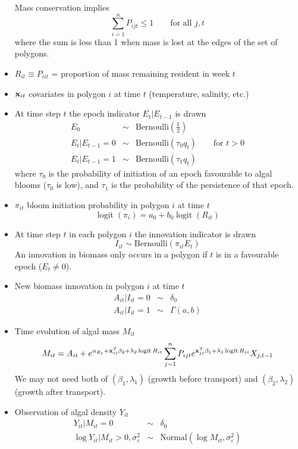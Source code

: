 \documentclass[
]{article}
\DeclareMathOperator*{\logit}{logit}
\begin{document}
\begin{itemize}
  Mass conservation implies \[ 
    \sum_{i=1}^n P_{ijt}\leq 1 \qquad\text{for all $j,t$}
  \] where the sum is less than 1 when mass is lost at the edges of the
  set of polygons.
\item
  \(R_{it} \equiv P_{iit}\) = proportion of mass remaining resident in
  week \(t\)
\item
  \({\bf x}_{it}\) covariates in polygon \(i\) at time \(t\)
  (temperature, salinity, etc.)
\item
  At time step \(t\) the epoch indicator \(E_t|E_{t-1}\) is drawn
  \begin{eqnarray*}
     E_0           &\sim& \text{Bernoulli}(\mbox{$\frac12$})\\
     E_t|E_{t-1}=0 &\sim& \text{Bernoulli}(\tau_0 q_t)\qquad\text{for $t>0$}\\
     E_t|E_{t-1}=1 &\sim& \text{Bernoulli}(\tau_1 q_t)
  \end{eqnarray*} where \(\tau_0\) is the probability of initiation of
  an epoch favourable to algal blooms (\(\tau_0\) is low), and
  \(\tau_1\) is the probability of the persistence of that epoch.
\item
  \(\pi_{it}\) bloom initiation probability in polygon \(i\) at time
  \(t\) \[
     \logit(\pi_i) = a_0 + b_0 \logit(R_{it})
  \]
\item
  At time step \(t\) in each polygon \(i\) the innovation indicator is
  drawn \[
     I_{it} \sim \text{Bernoulli}(\pi_{it}E_t)
  \] An innovation in biomass only occurs in a polygon if \(t\) is in a
  favourable epoch (\(E_t\neq 0\)).
\item
  New biomass innovation in polygon \(i\) at time \(t\)
  \begin{eqnarray*}
     A_{it} | I_{it}=0 &\sim& \delta_0\\
     A_{it} | I_{it}=1 &\sim& \Gamma(a,b)
  \end{eqnarray*}
\item
  Time evolution of algal mass \(M_{it}\) \[
     M_{it} = A_{it} + e^{\alpha_{E_t} + {\bf x}_{it}^T{\beta}_2 + \lambda_2 \logit R_{it}}
                       \sum_{j=1}^n P_{ijt} 
                                    e^{{\bf x}_{jt}^T{\beta}_1 + \lambda_1 \logit R_{jt}}
                                    X_{j,t-1}
  \] We may not need both of \(({\beta}_1,\lambda_1)\) (growth before
  transport) and \(({\beta}_2,\lambda_2)\) (growth after transport).
\item
  Observation of algal density \(Y_{it}\) \begin{eqnarray*}
    Y_{it} | M_{it} = 0 &\sim& \delta_0\\
    \log Y_{it} | M_{it}>0, \sigma_\varepsilon^2 &\sim& \text{Normal}(\log M_{it}, \sigma_\varepsilon^2)
  \end{eqnarray*}
\end{itemize}
\end{document}
